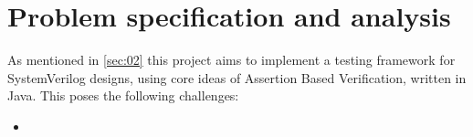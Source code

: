 \section{Problem specification and analysis}\label{sec:03}
As mentioned in \cref{sec:02} this project aims to implement a testing framework for SystemVerilog designs, using core ideas of Assertion Based Verification, written in Java. This poses the following challenges:
\begin{itemize}
    \item 
\end{itemize}